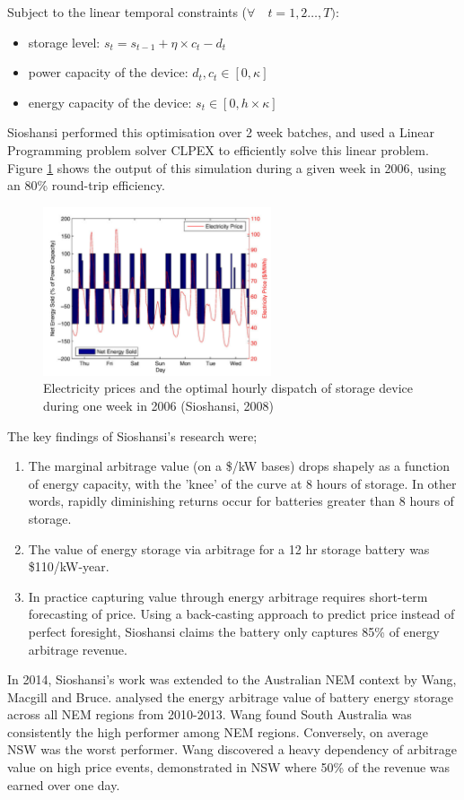 Subject to the linear temporal constraints ($\forall \quad t = 1,2 \dots, T)$: 
\begin{itemize}
    \item storage level: $s_t = s_{t-1} + \eta \times c_t - d_t $
    \item power capacity of the device: $d_t, c_t \in [0, \kappa]$
    \item energy capacity of the device: $s_t \in [0, h \times \kappa]$
\end{itemize}
Sioshansi performed this optimisation over 2 week batches, and used a Linear Programming problem solver CLPEX to efficiently solve this linear problem. Figure \ref{fig:sioshansidispatch} shows the output of this simulation during a given week in 2006, using an 80\% round-trip efficiency.
\begin{figure}
    \begin{center}
        \includegraphics[width=0.6\textwidth]{Pictures/Chapter2/Sioshansi_output.png}
    \end{center}
    
    \caption{Electricity prices and the optimal hourly dispatch of storage device during one
week in 2006 (Sioshansi, 2008) }
    \label{fig:sioshansidispatch}
\end{figure}
The key findings of Sioshansi's research were;
\begin{enumerate}
    \item The marginal arbitrage value (on a \$/kW bases) drops shapely as a function of energy capacity, with the 'knee' of the curve at 8 hours of storage. In other words, rapidly diminishing returns occur for batteries greater than 8 hours of storage. 
    \item The value of energy storage via arbitrage for a 12 hr storage battery was \$110/kW-year.
    \item In practice capturing value through energy arbitrage requires short-term forecasting of price. Using a back-casting approach to predict price instead of perfect foresight, Sioshansi claims the battery only captures 85\% of energy arbitrage revenue. 
\end{enumerate}
In 2014, Sioshansi's work was extended to the Australian NEM context by Wang, Macgill and Bruce. \citep{Wang} analysed the energy arbitrage value of battery energy storage across all NEM regions from 2010-2013. Wang found South Australia was consistently the high performer among NEM regions. Conversely, on average NSW was the worst performer. Wang discovered a heavy dependency of arbitrage value on high price events, demonstrated in NSW where 50\% of the revenue was earned over one day. 
